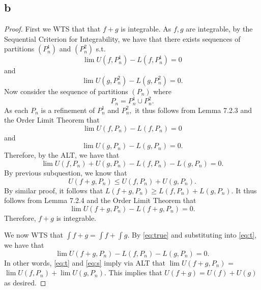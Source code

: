 \documentclass[10pt]{article}
\begin{document}
\subsection*{b}
\begin{proof}
    First we WTS that that $f+g$ is integrable.
    As $f,g$ are integrable, by the Sequential Criterion for Integrability, we have that there exists sequences of partitions $(P^1_n)$ and $(P^2_n)$ s.t. 
    \begin{equation*}
        \lim U(f,P^1_n)-L(f,P^1_n)=0
    \end{equation*}
    and
    \begin{equation*}
        \lim U(g,P^2_n)-L(g,P^2_n)=0.
    \end{equation*}
    Now consider the sequence of partitions $(P_n)$ where 
    \[P_n = P^1_n\cup P^2_n.\] As each $P_n$ is a refinement of $P^1_n$ and $P^2_n,$ it thus follows from Lemma 7.2.3 and the Order Limit Theorem that \[\lim U(f,P_n)-L(f,P_n)=0\] and \[\lim U(g,P_n)-L(g,P_n)=0.\] Therefore, by the ALT, we have that
    \begin{equation}\label{eq:t}
        \lim U(f,P_n)+ U(g,P_n)- L(f,P_n) - L(g,P_n)=0.
    \end{equation}
    By previous subquestion, we know that 
    \begin{equation} \label{eq:true}
        U(f+g,P_n)\le  U(f,P_n)+ U(g,P_n).
    \end{equation}
    By similar proof, it follows that $L(f+g,P_n)\ge  L(f,P_n)+ L(g,P_n).$ It thus follows from Lemma 7.2.4 and the Order Limit Theorem that \[\lim U(f+g,P_n) - L(f+g,P_n) =0.\] Therefore, $f+g$ is integrable.
    

    We now WTS that $\int f+g = \int f + \int g.$ By \eqref{eq:true} and substituting into \eqref{eq:t}, we have that
    \begin{equation} \label{eq:s}
         \lim U(f+g,P_n) - L(f,P_n) - L(g,P_n)=0.
    \end{equation}
    In other words, \eqref{eq:t} and \eqref{eq:s} imply via ALT that $\lim U(f+g,P_n)$ = $\lim U(f,P_n) + \lim U(g,P_n).$ This implies that $U(f+g)= U(f)+U(g)$ as desired.
\end{proof}
\end{document}
